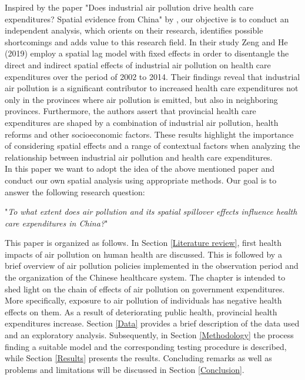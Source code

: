 \documentclass[
]{article}
\begin{document}
	Inspired by the paper "Does industrial air pollution drive health care expenditures? Spatial evidence from China" by \cite{zeng2019does}, our objective is to conduct an independent analysis, which orients on their research, identifies possible shortcomings and adds value to this research field. In their study Zeng and He (2019) employ a spatial lag model with fixed effects in order to disentangle the direct and indirect spatial effects of industrial air pollution on health care expenditures over the period of 2002 to 2014. Their findings reveal that industrial air pollution is a significant contributor to increased health care expenditures not only in the provinces where air pollution is emitted, but also in neighboring provinces. Furthermore, the authors assert that provincial health care expenditures are shaped by a combination of industrial air pollution, health reforms and other socioeconomic factors. These results highlight the importance of considering spatial effects and a range of contextual factors when analyzing the relationship between industrial air pollution and health care expenditures.\\ 

	In this paper we want to adopt the idea of the above mentioned paper and conduct our own spatial analysis using appropriate methods. Our goal is to answer the following research question:

	"\textit{To what extent does air pollution and its spatial spillover effects influence health care expenditures in China?}"

	This paper is organized as follows. In Section \ref{Literature review}, first health impacts of air pollution on human health are discussed. This is followed by a brief overview of air pollution policies implemented in the observation period and the organization of the Chinese healthcare system. The chapter is intended to shed light on the chain of effects of air pollution on government expenditures. More specifically, exposure to air pollution of individuals has negative health effects on them. As a result of deteriorating public health, provincial health expenditures increase. 
	Section \ref{Data} provides a brief description of the data used and an exploratory analysis. 
	Subsequently, in Section \ref{Methodology} the process finding a suitable model and the corresponding testing procedure is described, while Section \ref{Results} presents the results. 
	Concluding remarks as well as problems and limitations will be discussed  in Section \ref{Conclusion}. 
\end{document}
